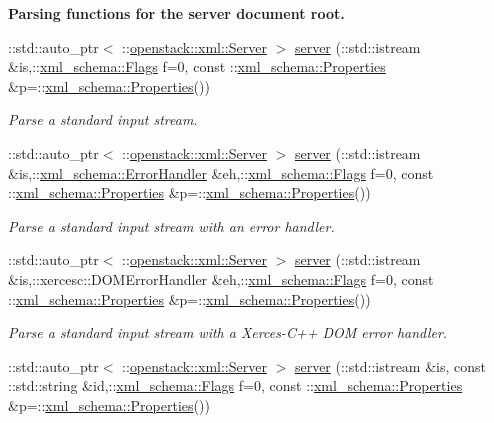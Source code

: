 \begin{Indent}{\bf Parsing functions for the server document root.}
\begin{DoxyCompactItemize}
::std::auto\_\-ptr$<$ ::\hyperlink{classopenstack_1_1xml_1_1Server}{openstack::xml::Server} $>$ \hyperlink{namespaceopenstack_1_1xml_a1cd0b074cb2a13f16cf5a85ef32511a2}{server} (::std::istream \&is,::\hyperlink{namespacexml__schema_affb4c227cbd9aa7453dd1dc5a1401943}{xml\_\-schema::Flags} f=0, const ::\hyperlink{namespacexml__schema_ad27ce19a7ee1d3b1064092648898f64c}{xml\_\-schema::Properties} \&p=::\hyperlink{namespacexml__schema_ad27ce19a7ee1d3b1064092648898f64c}{xml\_\-schema::Properties}())
\begin{DoxyCompactList}\small\item\em Parse a standard input stream. \item\end{DoxyCompactList}\item 
::std::auto\_\-ptr$<$ ::\hyperlink{classopenstack_1_1xml_1_1Server}{openstack::xml::Server} $>$ \hyperlink{namespaceopenstack_1_1xml_a08047bc21e1094dad7e0eb6f036374e6}{server} (::std::istream \&is,::\hyperlink{namespacexml__schema_ab1c9361bfd3b404eaabf0c31eded79dc}{xml\_\-schema::ErrorHandler} \&eh,::\hyperlink{namespacexml__schema_affb4c227cbd9aa7453dd1dc5a1401943}{xml\_\-schema::Flags} f=0, const ::\hyperlink{namespacexml__schema_ad27ce19a7ee1d3b1064092648898f64c}{xml\_\-schema::Properties} \&p=::\hyperlink{namespacexml__schema_ad27ce19a7ee1d3b1064092648898f64c}{xml\_\-schema::Properties}())
\begin{DoxyCompactList}\small\item\em Parse a standard input stream with an error handler. \item\end{DoxyCompactList}\item 
::std::auto\_\-ptr$<$ ::\hyperlink{classopenstack_1_1xml_1_1Server}{openstack::xml::Server} $>$ \hyperlink{namespaceopenstack_1_1xml_aa8b110d0fa3ccf862d523089271c6475}{server} (::std::istream \&is,::xercesc::DOMErrorHandler \&eh,::\hyperlink{namespacexml__schema_affb4c227cbd9aa7453dd1dc5a1401943}{xml\_\-schema::Flags} f=0, const ::\hyperlink{namespacexml__schema_ad27ce19a7ee1d3b1064092648898f64c}{xml\_\-schema::Properties} \&p=::\hyperlink{namespacexml__schema_ad27ce19a7ee1d3b1064092648898f64c}{xml\_\-schema::Properties}())
\begin{DoxyCompactList}\small\item\em Parse a standard input stream with a Xerces-\/C++ DOM error handler. \item\end{DoxyCompactList}\item 
::std::auto\_\-ptr$<$ ::\hyperlink{classopenstack_1_1xml_1_1Server}{openstack::xml::Server} $>$ \hyperlink{namespaceopenstack_1_1xml_a3d866591774069bc2c1df1d4bf5b5123}{server} (::std::istream \&is, const ::std::string \&id,::\hyperlink{namespacexml__schema_affb4c227cbd9aa7453dd1dc5a1401943}{xml\_\-schema::Flags} f=0, const ::\hyperlink{namespacexml__schema_ad27ce19a7ee1d3b1064092648898f64c}{xml\_\-schema::Properties} \&p=::\hyperlink{namespacexml__schema_ad27ce19a7ee1d3b1064092648898f64c}{xml\_\-schema::Properties}())

\end{DoxyCompactItemize}
\end{Indent}
